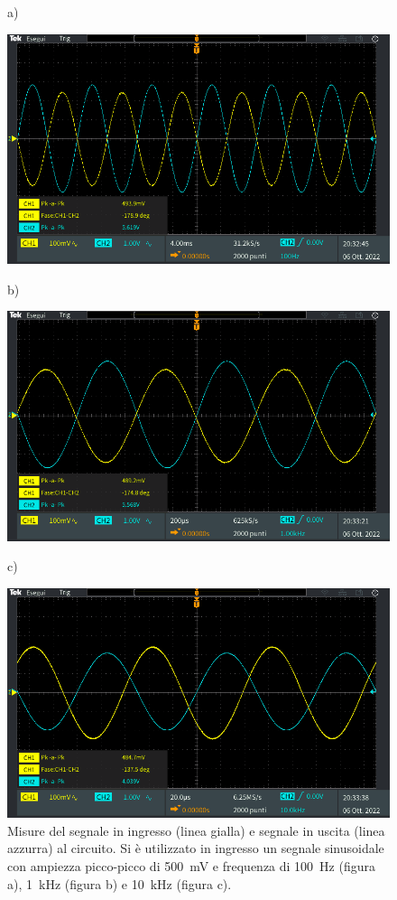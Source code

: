 \begin{figure}[h!]
	\centering
	a)
	
	\includegraphics[width=0.8\linewidth]{./ImageFiles/Laboratorio 1/TEK00001}	
\end{figure}
\begin{figure}[h!]
	\centering
	b)
	
	\includegraphics[width=0.8\linewidth]{./ImageFiles/Laboratorio 1/TEK00002}
\end{figure}
\begin{figure}[h!]
	\centering
	c)
	
	\includegraphics[width=0.8\linewidth]{./ImageFiles/Laboratorio 1/TEK00004}
	\caption{Misure del segnale in ingresso (linea gialla) e segnale in uscita (linea azzurra) al circuito. Si è utilizzato in ingresso un segnale sinusoidale con ampiezza picco-picco di \SI{500}{\milli\volt} e frequenza di \SI{100}{\hertz} (figura a), \SI{1}{\kilo\hertz} (figura b) e \SI{10}{\kilo\hertz} (figura c).}
	\label{fig:misure_oscilloscopio_1}
\end{figure}

